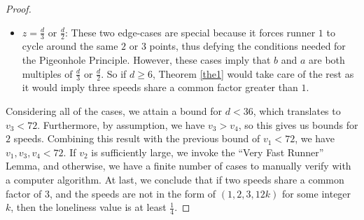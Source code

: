 \documentclass[11pt]{amsart}
\newcommand{\floor}[1]{\lfloor #1 \rfloor}
\newcommand{\Floor}[1]{\left\lfloor #1 \right\rfloor}
\begin{document}
\begin{proof}
\begin{itemize}
        $$|L_0 \cup L_1| \geq 2 \cdot \Floor{\frac{d}{4}} + \Floor{\frac{d}{12}}.$$
        There are at least $\floor{\frac{d}{2}}$ number of valid positions for runner $2$, and if one of the first $\floor{\frac{d}{2}} - 1$ positions is in either $L_0$ or $L_1$, the desired conditions are met. Thus by the Pigeonhole Principle, we derive the following inequality
        $$\Floor{\frac{d}{2}} - 1 > d - |L_0 \cup L_1| \implies \Floor{\frac{d}{2}} - 1 > d - \left(2 \cdot \Floor{\frac{d}{4}} + \Floor{\frac{d}{12}}\right).$$
        This is true for all $d \geq 36$.
        \item $z = \frac{d}{3}$ or $\frac{d}{2}$: These two edge-cases are special because it forces runner $1$ to cycle around the same $2$ or $3$ points, thus defying the conditions needed for the Pigeonhole Principle. However, these cases imply that $b$ and $a$ are both multiples of $\frac{d}{3}$ or $\frac{d}{2}$. So if $d \geq 6$, Theorem \ref{the1} would take care of the rest as it would imply three speeds share a common factor greater than $1$.
    \end{itemize}
    Considering all of the cases, we attain a bound for $d < 36$, which translates to $v_3 < 72$. Furthermore, by assumption, we have $v_3 > v_4$, so this gives us bounds for $2$ speeds. Combining this result with the previous bound of $v_1 < 72$, we have $v_1,v_3,v_4 < 72$. If $v_2$ is sufficiently large, we invoke the ``Very Fast Runner'' Lemma, and otherwise, we have a finite number of cases to manually verify with a computer algorithm. At last, we conclude that if two speeds share a common factor of $3$, and the speeds are not in the form of $(1,2,3,12k)$ for some integer $k$, then the loneliness value is at least $\frac{1}{4}$.
\end{proof}
\end{document}
